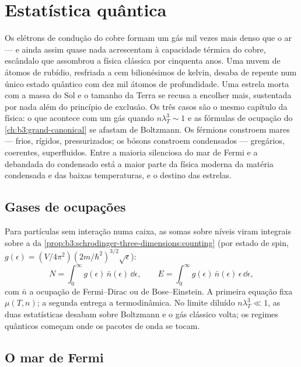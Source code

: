\chapter{Estatística quântica}\label{ch:b3:quantum-statistics}

Os elétrons de condução do cobre formam um gás mil vezes mais denso que
o ar --- e ainda assim quase nada acrescentam à capacidade térmica do
cobre, escândalo que assombrou a física clássica por cinquenta anos. Uma
nuvem de átomos de rubídio, resfriada a cem bilionésimos de kelvin,
desaba de repente num único estado quântico com dez mil átomos
de profundidade. Uma estrela morta com a massa do Sol e o tamanho da
Terra se recusa a encolher mais, sustentada por nada além do princípio
de exclusão. Os três casos são o mesmo capítulo da física: o que
acontece com um gás quando $n\lambda_T^3 \sim 1$ e as fórmulas de
ocupação do \cref{ch:b3:grand-canonical} se afastam de Boltzmann. Os
férmions constroem mares --- frios, rígidos, pressurizados; os bósons
constroem condensados --- gregários, coerentes, superfluidos. Entre a
maioria silenciosa do mar de Fermi e a debandada do condensado está a
maior parte da física moderna da matéria condensada e das baixas
temperaturas, e o destino das estrelas.

\section{Gases de ocupações}

\begin{proposition}\label{prop:b3:quantum-statistics:machinery}
Para partículas sem interação numa caixa, as somas sobre níveis viram
integrais sobre a  da
\cref{prop:b3:schrodinger-three-dimensions:counting} (por estado de
spin, $g(\epsilon) = (V/4\pi^2)(2m/\hbar^2)^{3/2}\sqrt\epsilon$):
\[
N = \int_0^\infty g(\epsilon)\,\bar n(\epsilon)\,\dd\epsilon ,
\qquad
E = \int_0^\infty g(\epsilon)\,\bar n(\epsilon)\,\epsilon\,
\dd\epsilon ,
\]
com $\bar n$ a ocupação de Fermi--Dirac ou de Bose--Einstein. A
primeira equação fixa $\mu(T, n)$; a segunda entrega a
termodinâmica. No limite diluído $n\lambda_T^3 \ll 1$, as duas
estatísticas desabam sobre Boltzmann e o gás clássico volta;
os regimes quânticos começam onde os pacotes de onda se tocam.
\end{proposition}
\admitted

\section{O mar de Fermi}

